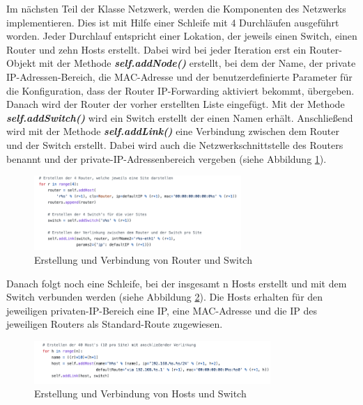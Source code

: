 \documentclass[fontsize=12pt,paper=a4,open=any,parskip=half,
  twoside=false,toc=listof,toc=bibliography,fleqn,leqno,
  captions=nooneline,captions=tableabove,british]{scrbook}
\begin{document}
Im nächsten Teil der Klasse Netzwerk, werden die Komponenten des Netzwerks implementieren. Dies ist mit Hilfe einer Schleife mit 4 Durchläufen ausgeführt worden. Jeder Durchlauf entspricht einer Lokation, der jeweils einen Switch, einen Router und zehn Hosts erstellt. Dabei wird bei jeder Iteration erst ein Router-Objekt mit der Methode \textit{\textbf{self.addNode()}} erstellt, bei dem der Name, der private IP-Adressen-Bereich, die MAC-Adresse und der benutzerdefinierte Parameter für die Konfiguration, dass der Router IP-Forwarding aktiviert bekommt, übergeben. Danach wird der Router der vorher erstellten Liste eingefügt. Mit der Methode \textit{\textbf{self.addSwitch()}} wird ein Switch erstellt der einen Namen erhält. Anschließend wird mit der Methode \textit{\textbf{self.addLink()}} eine Verbindung zwischen dem Router und der Switch erstellt. Dabei wird auch die Netzwerkschnittstelle des Routers benannt und der private-IP-Adressenbereich vergeben  (siehe Abbildung \ref{mininet2}).

\begin{figure}[H]
 \centering
 \includegraphics[width=0.7\textwidth]{Bilder/mininet2}
 \captionsetup{justification=centering,margin=1cm}
 \caption{Erstellung und Verbindung von Router und Switch}
 \label{mininet2}
\end{figure}

Danach folgt noch eine Schleife, bei der insgesamt n Hosts erstellt und mit dem Switch verbunden werden (siehe Abbildung \ref{mininet3}). Die Hosts erhalten für den jeweiligen privaten-IP-Bereich eine IP, eine MAC-Adresse und die IP des jeweiligen Routers als Standard-Route zugewiesen.
 
\begin{figure}[H]
 \centering
 \includegraphics[width=0.8\textwidth]{Bilder/mininet3}
 \captionsetup{justification=centering,margin=1cm}
 \caption{Erstellung und Verbindung von Hosts und Switch}
 \label{mininet3}
\end{figure}
\end{document}
